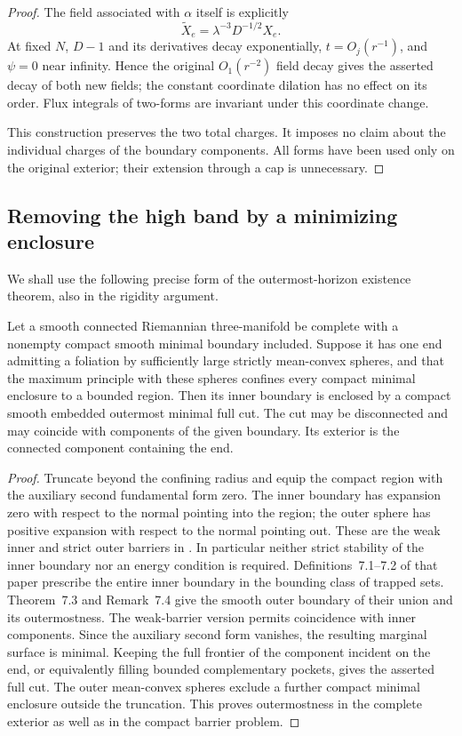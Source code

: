 \begin{proof}
The field associated with $\alpha$ itself is explicitly
\[
 \widetilde X_e=\lambda^{-3}D^{-1/2}X_e.
\]
At fixed $N$, $D-1$ and its derivatives decay exponentially,
$t=O_j(r^{-1})$, and $\psi=0$ near infinity.  Hence the original
$O_1(r^{-2})$ field decay gives the asserted decay of both new fields;
the constant coordinate dilation has no effect on its order.  Flux
integrals of two-forms are invariant under this coordinate change.

This construction preserves the two total charges.  It imposes no
claim about the individual charges of the boundary components.
All forms have been used only on the original exterior; their
extension through a cap is unnecessary.
\end{proof}

\subsection{Removing the high band by a minimizing enclosure}

We shall use the following precise form of the outermost-horizon
existence theorem, also in the rigidity argument.

\begin{lemma}\label{cp:outermost-enclosure}
Let a smooth connected Riemannian three-manifold be complete with a
nonempty compact smooth minimal boundary included.  Suppose it has one
end admitting a foliation by sufficiently large strictly mean-convex
spheres, and that the maximum principle with these spheres confines
every compact minimal enclosure to a bounded region.  Then its inner
boundary is enclosed by a compact smooth embedded outermost minimal
full cut.  The cut may be disconnected and may coincide with components
of the given boundary.  Its exterior is the connected component
containing the end.
\end{lemma}

\begin{proof}
Truncate beyond the confining radius and equip the compact region with
the auxiliary second fundamental form zero.  The inner boundary has
expansion zero with respect to the normal pointing into the region;
the outer sphere has positive expansion with respect to the normal
pointing out.  These are the weak inner and strict outer barriers in
\cite[Theorem~5.1]{AnderssonMetzger2009}.  In particular neither
strict stability of the inner boundary nor an energy condition is
required.  Definitions~7.1--7.2 of that paper prescribe the entire
inner boundary in the bounding class of trapped sets.  Theorem~7.3
and Remark~7.4 give the smooth outer boundary of their union and its
outermostness.  The weak-barrier version permits coincidence with
inner components.  Since the auxiliary second form vanishes, the
resulting marginal surface is minimal.  Keeping the full frontier of
the component incident on the end, or equivalently filling bounded
complementary pockets, gives the asserted full cut.  The outer
mean-convex spheres exclude a further compact minimal enclosure
outside the truncation.  This proves outermostness in the complete
exterior as well as in the compact barrier problem.
\end{proof}

